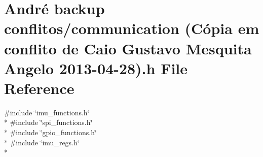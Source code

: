 \hypertarget{communication_01_07C_xC3_xB3pia_01em_01conflito_01de_01Caio_01Gustavo_01Mesquita_01Angelo_012013-04-28_08_8h}{\section{André backup conflitos/communication (Cópia em conflito de Caio Gustavo Mesquita Angelo 2013-\/04-\/28).h File Reference}
\label{communication_01_07C_xC3_xB3pia_01em_01conflito_01de_01Caio_01Gustavo_01Mesquita_01Angelo_012013-04-28_08_8h}
}
{\ttfamily \#include \char`\"{}imu\-\_\-functions.\-h\char`\"{}}\\*
{\ttfamily \#include \char`\"{}spi\-\_\-functions.\-h\char`\"{}}\\*
{\ttfamily \#include \char`\"{}gpio\-\_\-functions.\-h\char`\"{}}\\*
{\ttfamily \#include \char`\"{}imu\-\_\-regs.\-h\char`\"{}}\\*
